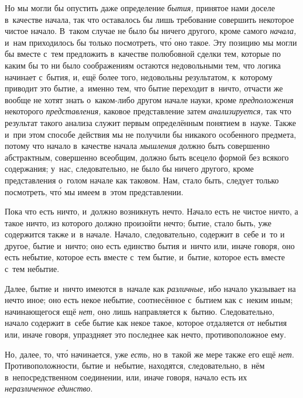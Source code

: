 Но мы могли бы опустить даже определение {\em бытия,} принятое нами доселе
в~качестве начала, так что оставалось бы лишь требование совершить некоторое
чистое начало. В~таком случае не было бы ничего другого, кроме самого
{\em начала,} и~нам приходилось бы только посмотреть, чт\'{о} оно такое. Эту
позицию мы могли бы вместе с~тем предложить в~качестве полюбовной сделки тем,
которые по каким бы то ни было соображениям остаются недовольными тем, что
логика начинает с~бытия, и, ещё более того, недовольны результатом, к~которому
приводит это бытие, а~именно тем, что бытие переходит в~ничто, отчасти же
вообще не хотят знать о~каком-либо другом начале науки, кроме
{\em предположения} некоторого {\em представления,} каковое представление затем
{\em анализируется,} так что результат такого анализа служит первым
определённым понятием в~науке. Также и~при этом способе действия мы не получили
бы никакого особенного предмета, потому что начало в~качестве начала
{\em мышления} должно быть совершенно абстрактным, совершенно всеобщим, должно
быть всецело формой без всякого содержания; у~нас, следовательно, не было бы
ничего другого, кроме представления о~голом начале как таковом. Нам, стало
быть, следует только посмотреть, чт\'{о} мы имеем в~этом представлении.

Пока что есть ничто, и~должно возникнуть нечто. Начало есть не чистое ничто,
а такое ничто, из которого должно произойти нечто; бытие, стало быть, уже
содержится также и~в начале. Начало, следовательно, содержит в~себе и~то и
другое, бытие и~ничто; оно есть единство бытия и~ничто или, иначе говоря,
оно есть небытие, которое есть вместе с~тем бытие, и~бытие, которое есть
вместе с~тем небытие.

Далее, бытие и~ничто имеются в~начале как {\em различные,} ибо начало указывает
на нечто иное; оно есть некое небытие, соотнесённое с~бытием как с~неким иным;
начинающегося ещё {\em нет,} оно лишь направляется к~бытию. Следовательно,
начало содержит в~себе бытие как некое такое, которое отдаляется от небытия
или, иначе говоря, упраздняет это последнее как нечто, противоположное ему.

Но, далее, то, чт\'{о} начинается, уже {\em есть,} но в~такой же мере также его
ещё {\em нет}. Противоположности, бытие и~небытие, находятся, следовательно,
в~нём в~непосредственном соединении, или, иначе говоря, начало есть их
{\em неразличенное единство}.

